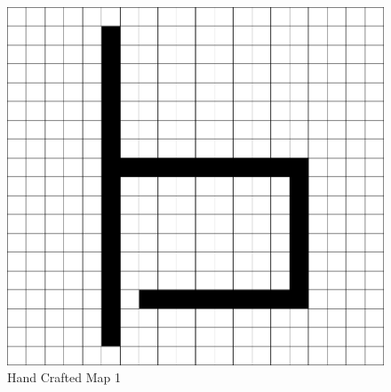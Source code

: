 \clearpage

\begin{figure}[h!]
    \centering
    \includegraphics[scale=0.82]{images/m4.png}
    \caption{Hand Crafted Map 1}
    \label{fig: rep_Hand Crafted Map 1}
\end{figure}


